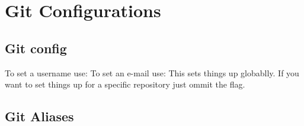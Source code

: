 \chapter{Git Configurations}
\chapteroverlayB

\section{Git config}
To set a username use: 
\newline\noindent To set an e-mail use: 
\newline\noindent This sets things up globablly. If you want to set things up for a specific repository just ommit the  flag.

\section{Git Aliases}